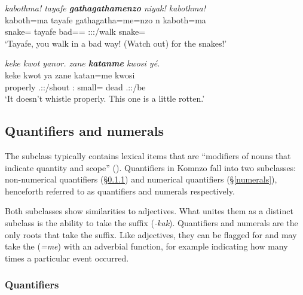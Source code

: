 \begin{exe}
	\ex \emph{kabothma! tayafe \textbf{gathagathamenzo} niyak! kabothma!}\\
	\gll kaboth=ma tayafe {gathagatha=me=nzo} n kaboth=ma\\
	snake=\Char{} tayafe bad=\Ins=\Only{} \Ssg:\Sbj:\Nonpast:\Ipfv/walk snake=\Char{}\\
	\trans `Tayafe, you walk in a bad way! (Watch out) for the snakes!'\\ 
	\label{ex050}
\end{exe}
\begin{exe}
	\ex \emph{keke kwot yanor. zane \textbf{katanme} kwosi yé.}\\
	\gll keke kwot ya zane katan=me kwosi \\
	\Neg{} properly \Tsg.\Masc:\Sbj:\Nonpast/shout \Dem:\Prox{} small=\Ins{} dead \Tsg.\Masc:\Nonpast:\Ipfv/be\\
	\trans `It doesn't whistle properly. This one is a little rotten.'\\ 
	\label{ex043}
\end{exe}

\subsection{Quantifiers and numerals} \label{numquant}

The  subclass typically contains lexical items that are ``modifiers of nouns that indicate quantity and scope'' (\citealt[37]{Schachter:2007vv}). Quantifiers in Komnzo fall into two subclasses: non-numerical quantifiers (\S{}\ref{quantifiers}) and numerical quantifiers (\S{}\ref{numerals}), henceforth referred to as quantifiers and numerals respectively.%

Both subclasses show similarities to adjectives. What unites them as a distinct subclass is the ability to take the  suffix (\emph{-kak}). Quantifiers and numerals are the only roots that take the  suffix. Like adjectives, they can be flagged for  and may take the   (\emph{=me}) with an adverbial function, for example indicating how many times a particular event occurred.

\subsubsection{Quantifiers} \label{quantifiers}

